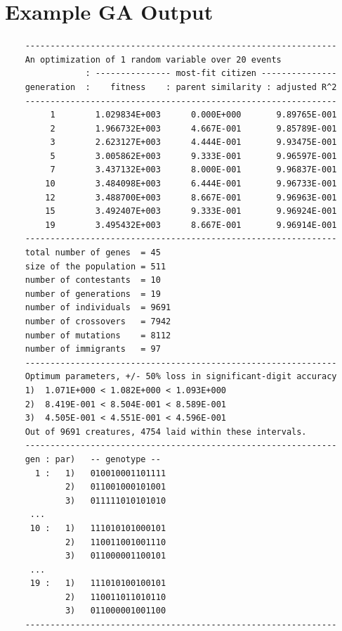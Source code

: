 \documentclass[twocolumn,twoside,fleqn,12pt]{article}
\begin{document}


\fontsize{12}{14.7}\selectfont

\onecolumn
\appendix

\section{Example GA Output}
\label{GaAppendix}

\begin{verbatim}
    --------------------------------------------------------------
    An optimization of 1 random variable over 20 events
                : --------------- most-fit citizen ---------------
    generation  :    fitness    : parent similarity : adjusted R^2
    --------------------------------------------------------------
         1        1.029834E+003      0.000E+000       9.89765E-001
         2        1.966732E+003      4.667E-001       9.85789E-001
         3        2.623127E+003      4.444E-001       9.93475E-001
         5        3.005862E+003      9.333E-001       9.96597E-001
         7        3.437132E+003      8.000E-001       9.96837E-001
        10        3.484098E+003      6.444E-001       9.96733E-001
        12        3.488700E+003      8.667E-001       9.96963E-001
        15        3.492407E+003      9.333E-001       9.96924E-001
        19        3.495432E+003      8.667E-001       9.96914E-001
    --------------------------------------------------------------
    total number of genes  = 45
    size of the population = 511
    number of contestants  = 10
    number of generations  = 19
    number of individuals  = 9691
    number of crossovers   = 7942
    number of mutations    = 8112
    number of immigrants   = 97
    --------------------------------------------------------------
    Optimum parameters, +/- 50% loss in significant-digit accuracy
    1)  1.071E+000 < 1.082E+000 < 1.093E+000
    2)  8.419E-001 < 8.504E-001 < 8.589E-001
    3)  4.505E-001 < 4.551E-001 < 4.596E-001
    Out of 9691 creatures, 4754 laid within these intervals.
    --------------------------------------------------------------
    gen : par)   -- genotype --
      1 :   1)   010010001101111
            2)   011001000101001
            3)   011111010101010
     ...
     10 :   1)   111010101000101
            2)   110011001001110
            3)   011000001100101
     ...
     19 :   1)   111010100100101
            2)   110011011010110
            3)   011000001001100
    --------------------------------------------------------------
\end{verbatim}
\end{document}
